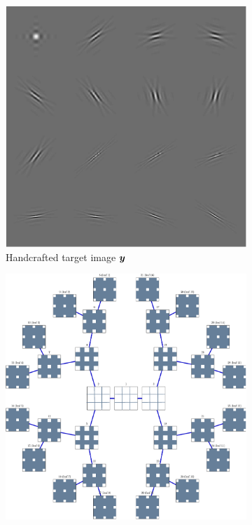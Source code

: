 \begin{figure}[!ht] \centering
\begin{subfigure}[b]{0.325\textwidth}\centering
\includegraphics[width=\textwidth]{figures/tree-learn-setup/target.pdf} 
	\caption{Handcrafted target image $\bm{y}$}
\end{subfigure}
\begin{subfigure}[b]{0.325\textwidth}\centering
\includegraphics[width=1\textwidth]{figures/tree-learn-setup/xp_learnsupp256_curvelet_decomp3[tree-binary_dpth4]_supp-generic3x3_[fixed-supports]_tree.pdf}

\end{subfigure}
\end{figure}

